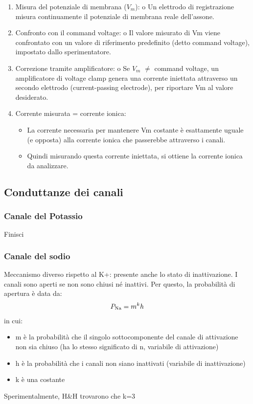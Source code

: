 \begin{enumerate}
    \item Misura del potenziale di membrana ($V_m$): o Un elettrodo di registrazione misura continuamente il potenziale di membrana reale dell'assone. 
    \item Confronto con il command voltage: o Il valore misurato di Vm viene confrontato con un valore di riferimento predefinito (detto command voltage), impostato dallo sperimentatore. 
    \item Correzione tramite amplificatore: o Se $V_m$ $\ne$ command voltage, un amplificatore di voltage clamp genera una corrente iniettata attraverso un secondo elettrodo (current-passing electrode), per riportare Vm al valore desiderato.  \\
    \item Corrente misurata = corrente ionica:
    \begin{itemize}
        \item La corrente necessaria per mantenere Vm costante è esattamente uguale (e opposta) alla corrente ionica che passerebbe attraverso i canali.
        \item Quindi misurando questa corrente iniettata, si ottiene la corrente ionica da analizzare.
    \end{itemize} 
\end{enumerate}
\subsection{Conduttanze dei canali}
\subsubsection{Canale del Potassio}
Finisci
\subsubsection{Canale del sodio}
Meccanismo diverso rispetto al K+: presente anche lo stato di inattivazione. I canali sono aperti se non sono chiusi né inattivi. Per questo, la probabilità di apertura è data da:  
\begin{equation}
    P_{\ce{Na}} = m^kh
\end{equation}  in cui:
\begin{itemize}
    \item m è la probabilità che il singolo sottocomponente del canale di attivazione non sia chiuso (ha lo stesso significato di n, variabile di attivazione)
    \item  h è la probabilità che i canali non siano inattivati (variabile di inattivazione)
    \item k è una costante
\end{itemize}
Sperimentalmente, H\&H trovarono che k=3
